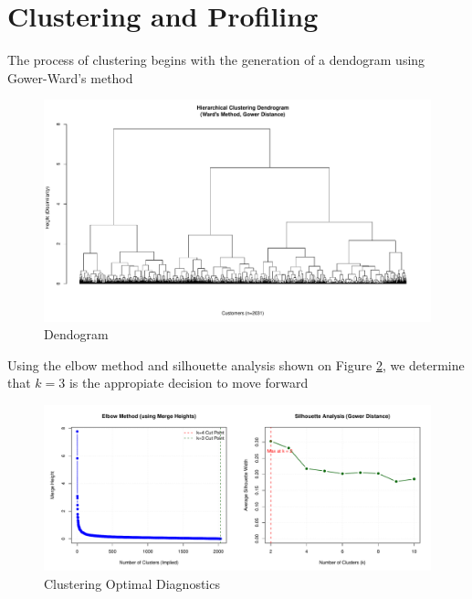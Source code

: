 \section{Clustering and Profiling}

The process of clustering begins with the generation of a dendogram using Gower-Ward's method

\begin{figure}[H]
    \centering
    \includegraphics[width=1\linewidth]{Imatges/dendrogram_Gower_Ward.pdf}
    \caption{Dendogram}
    \label{fig:dend}
\end{figure}

Using the elbow method and silhouette analysis shown on Figure \ref{fig:optdig}, we determine that $k = 3$ is the appropiate decision to move forward

\begin{figure}[H]
    \centering
    \includegraphics[width=1\linewidth]{Imatges/Clustering_OptimalK_Diagnostics_Gower.pdf}
    \caption{Clustering Optimal Diagnostics}
    \label{fig:optdig}
\end{figure}
